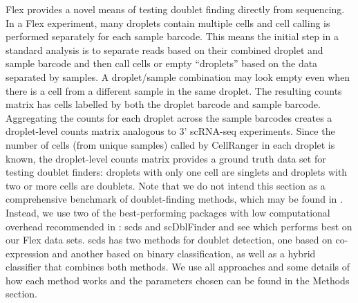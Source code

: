 \documentclass[unnumsec,webpdf,modern,large]{oup-authoring-template}
\begin{document}
	
	Flex provides a novel means of testing doublet finding directly from sequencing. 
	In a Flex experiment, many droplets contain multiple cells and cell calling is performed separately for each sample barcode. 
	This means the initial step in a standard analysis is to separate reads based on their combined droplet and sample barcode and then call cells or empty “droplets” based on the data separated by samples. 
	A droplet/sample combination may look empty even when there is a cell from a different sample in the same droplet. 
	The resulting counts matrix has cells labelled by both the droplet barcode and sample barcode.
	Aggregating the counts for each droplet across the sample barcodes creates a droplet-level counts matrix analogous to 3’ scRNA-seq experiments. 
	Since the number of cells (from unique samples) called by CellRanger in each droplet is known, the droplet-level counts matrix provides a ground truth data set for testing doublet finders: droplets with only one cell are singlets and droplets with two or more cells are doublets. 
	Note that we do not intend this section as a comprehensive benchmark of doublet-finding methods, which may be found in 
	\citep{Neavin2024}.
	Instead, we use two of the best-performing packages with low computational overhead recommended in 
	\citep{Neavin2024}:
	scds 
	\citep{Bais2020}
	and scDblFinder 
	\citep{Germain2021}
	and see which performs best on our Flex data sets. 
	scds has two methods for doublet detection, one based on co-expression and another based on binary classification, as well as a hybrid classifier that combines both methods. 
	We use all approaches and some details of how each method works and the parameters chosen can be found in the Methods section. 
	
\end{document}
